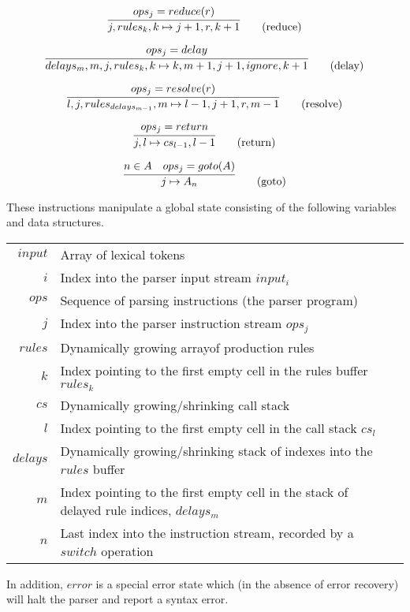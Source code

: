 \documentclass[A4]{sig-alternate}
\begin{document}
\begin{equation}
\infer{j, rules_k, k \mapsto j+1, r, k+1}{ops_j = reduce(r)} \tag{reduce}
\end{equation}

\begin{equation}
\infer{delays_m, m, j, rules_k, k \mapsto k, m+1, j+1, ignore, k+1}{ops_j = delay} \tag{delay}
\end{equation}

\begin{equation}
\infer{l, j, rules_{delays_{m-1}}, m \mapsto l-1, j+1, r, m-1}{ops_j = resolve(r)} \tag{resolve}
\end{equation}

\begin{equation}
\infer{j, l \mapsto cs_{l-1}, l-1}{ops_j = return} \tag{return}
\end{equation}

\begin{equation}
\infer{j \mapsto A_{n}}{n \in A & ops_j = goto(A)} \tag{goto}
\end{equation}

These instructions manipulate a global state consisting of the following variables and data structures.
\begin{center}
{\small
\renewcommand{\tabcolsep}{5pt}
\renewcommand{\arraystretch}{1.3}
\begin{tabular}{r p{6cm} l}
$input$  & Array of lexical tokens\\
$i$      & Index into the parser input stream $input_i$\\
$ops$    & Sequence of parsing instructions (the parser program)\\
$j$      & Index into the parser instruction stream $ops_j$\\
$rules$  & Dynamically growing array\footnotemark\;of production rules\\
$k$      & Index pointing to the first empty cell in the rules buffer $rules_k$\\
$cs$     & Dynamically growing/shrinking call stack\\
$l$      & Index pointing to the first empty cell in the call stack $cs_l$\\
$delays$ & Dynamically growing/shrinking stack of indexes into the $rules$ buffer\\
$m$      & Index pointing to the first empty cell in the stack of delayed rule indices, $delays_m$\\
$n$      & Last index into the instruction stream, recorded by a $switch$ operation
\end{tabular}}
\end{center}
In addition, $error$ is a special error state which (in the absence of error recovery) will halt the parser and report a syntax error.
\end{document}
